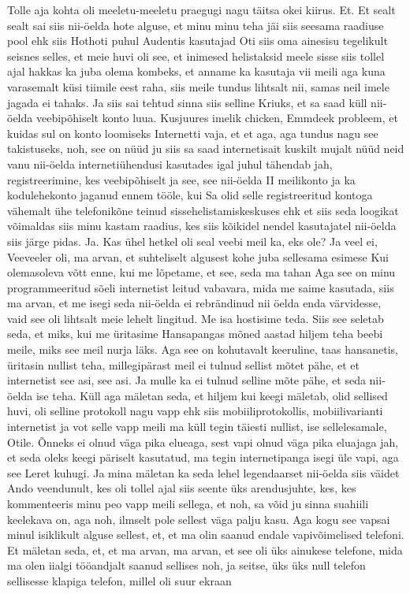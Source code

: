 Tolle aja kohta oli meeletu-meeletu praegugi nagu täitsa okei kiirus. Et.
Et sealt sealt sai siis nii-öelda hote alguse, et minu minu teha jäi siis seesama raadiuse pool ehk siis Hothoti puhul Audentis kasutajad Oti siis oma ainesisu tegelikult seisnes selles, et meie huvi oli see, et inimesed helistaksid meele sisse siis tollel ajal hakkas ka juba olema kombeks, et anname ka kasutaja vii meili aga kuna varasemalt küsi tiimile eest raha, siis meile tundus lihtsalt nii, samas neil imele jagada ei tahaks. Ja siis sai tehtud sinna siis selline Kriuks, et sa saad küll nii-öelda veebipõhiselt konto luua. Kusjuures imelik chicken, Emmdeek probleem, et kuidas sul on konto loomiseks Internetti vaja, et et aga, aga tundus nagu see takistuseks, noh, see on nüüd ju siis sa saad internetisait kuskilt mujalt nüüd neid vanu nii-öelda internetiühendusi kasutades igal juhul tähendab jah, registreerimine, kes veebipõhiselt ja see, see nii-öelda II meilikonto ja ka kodulehekonto jaganud ennem tööle, kui Sa olid selle registreeritud kontoga vähemalt ühe telefonikõne teinud sissehelistamiskeskuses ehk et siis seda loogikat võimaldas siis minu kastam raadius, kes siis kõikidel nendel kasutajatel nii-öelda siis järge pidas. Ja.
Kas ühel hetkel oli seal veebi meil ka, eks ole?
Ja veel ei, Veeveeler oli, ma arvan, et suhteliselt algusest kohe juba sellesama esimese
Kui olemasoleva võtt enne, kui me lõpetame, et see, seda ma tahan
Aga see on minu programmeeritud sõeli internetist leitud vabavara, mida me saime kasutada, siis ma arvan, et me isegi seda nii-öelda ei rebrändinud nii öelda enda värvidesse, vaid see oli lihtsalt meie lehelt lingitud. Me isa hostisime teda.
Siis see seletab seda, et miks, kui me üritasime Hansapangas mõned aastad hiljem teha beebi meile, miks see meil nurja läks. Aga see on kohutavalt keeruline, taas hansanetis, üritasin nullist teha, millegipärast meil ei tulnud sellist mõtet pähe, et et internetist see asi, see asi.
Ja mulle ka ei tulnud selline mõte pähe, et seda nii-öelda ise teha. Küll aga mäletan seda, et hiljem kui keegi mäletab, olid sellised huvi, oli selline protokoll nagu vapp ehk siis mobiiliprotokollis, mobiilivarianti internetist ja vot selle vapp meili ma küll tegin täiesti nullist, ise sellelesamale, Otile.
Õnneks ei olnud väga pika elueaga, sest vapi olnud väga pika eluajaga jah, et seda oleks keegi päriselt kasutatud, ma tegin internetipanga isegi üle vapi, aga see Leret kuhugi.
Ja mina mäletan ka seda lehel legendaarset nii-öelda siis väidet Ando veendunult, kes oli tollel ajal siis seente üks arendusjuhte, kes, kes kommenteeris minu peo vapp meili sellega, et noh, sa võid ju sinna suahiili keelekava on, aga noh, ilmselt pole sellest väga palju kasu. Aga kogu see vapsai minul isiklikult alguse sellest, et, et ma olin saanud endale vapivõimelised telefoni. Et mäletan seda, et, et ma arvan, ma arvan, et see oli üks ainukese telefone, mida ma olen iialgi tööandjalt saanud sellises noh, ja seitse, üks üks null telefon sellisesse klapiga telefon, millel oli suur ekraan
